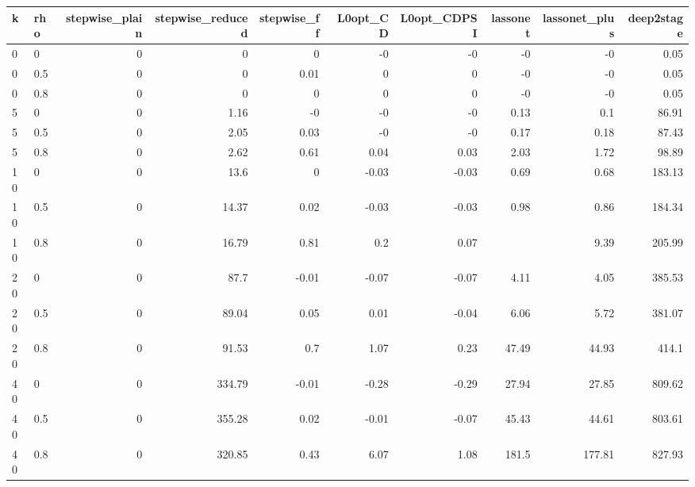 \begin{tabular}{llrrrrrrrr}
\toprule
k & rho & stepwise\_plain & stepwise\_reduced & stepwise\_ff & L0opt\_CD & L0opt\_CDPSI & lassonet & lassonet\_plus & deep2stage \\
\midrule
0 & 0 & 0 & 0 & 0 & -0 & -0 & -0 & -0 & 0.05 \\
0 & 0.5 & 0 & 0 & 0.01 & 0 & 0 & -0 & -0 & 0.05 \\
0 & 0.8 & 0 & 0 & 0 & 0 & 0 & -0 & -0 & 0.05 \\
5 & 0 & 0 & 1.16 & -0 & -0 & -0 & 0.13 & 0.1 & 86.91 \\
5 & 0.5 & 0 & 2.05 & 0.03 & -0 & -0 & 0.17 & 0.18 & 87.43 \\
5 & 0.8 & 0 & 2.62 & 0.61 & 0.04 & 0.03 & 2.03 & 1.72 & 98.89 \\
10 & 0 & 0 & 13.6 & 0 & -0.03 & -0.03 & 0.69 & 0.68 & 183.13 \\
10 & 0.5 & 0 & 14.37 & 0.02 & -0.03 & -0.03 & 0.98 & 0.86 & 184.34 \\
10 & 0.8 & 0 & 16.79 & 0.81 & 0.2 & 0.07 &  & 9.39 & 205.99 \\
20 & 0 & 0 & 87.7 & -0.01 & -0.07 & -0.07 & 4.11 & 4.05 & 385.53 \\
20 & 0.5 & 0 & 89.04 & 0.05 & 0.01 & -0.04 & 6.06 & 5.72 & 381.07 \\
20 & 0.8 & 0 & 91.53 & 0.7 & 1.07 & 0.23 & 47.49 & 44.93 & 414.1 \\
40 & 0 & 0 & 334.79 & -0.01 & -0.28 & -0.29 & 27.94 & 27.85 & 809.62 \\
40 & 0.5 & 0 & 355.28 & 0.02 & -0.01 & -0.07 & 45.43 & 44.61 & 803.61 \\
40 & 0.8 & 0 & 320.85 & 0.43 & 6.07 & 1.08 & 181.5 & 177.81 & 827.93 \\
\bottomrule
\end{tabular}
